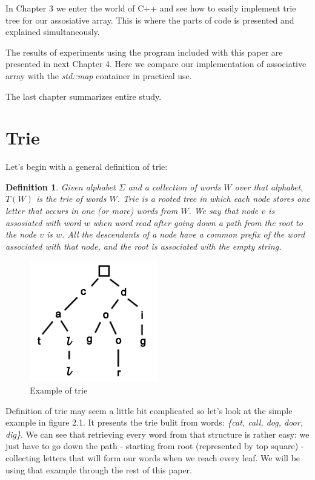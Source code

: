 \documentclass[a4paper,12pt]{article}
\newcommand\CC{\Lang{\mbox{C++}}\xspace}
\newcommand\Lang[1]{\textsc{#1}}
\newtheorem{defi}{Definition}
\begin{document}
In Chapter 3 we enter the world of \CC{} and see how to easily implement trie tree for our assosiative array.
This is where the parts of code is presented and explained simultaneously.

The results of experiments using the program included with this paper are presented in next Chapter 4.
Here we compare our implementation of associative array with the \emph{std::map} container in practical use. 

The last chapter summarizes entire study.
\section{Trie}

Let's begin with a general definition of trie:

\begin{defi}
Given alphabet $\Sigma$ and a collection of words $W$ over that alphabet, $T(W)$ is the trie of words $W$.
Trie is a rooted tree in which each node stores one letter that occurs in one (or more) words from $W$. We say that node $v$ is assosiated with word $w$ when word read after going down a path from the root to the node $v$ is $w$. All the descendants of a node have a common prefix of the word associated with that node, and the root is associated with the empty string. 
\end{defi}

\begin{figure}[ht]
\begin{center}
\includegraphics[scale=0.60,angle=0]{trie1.png}
\caption{Example of trie}
\end{center}
\end{figure}

Definition of trie may seem a little bit complicated so let's look at the simple example in figure 2.1. It presents the trie bulit from words: \emph{\{cat, call, dog, door, dig\}}. We can see that retrieving every word from that structure is rather easy: we just have to go down the path - starting from root (represented by top square) - collecting letters that will form our words when we reach every leaf. We will be using that example through the rest of this paper.
\end{document}
